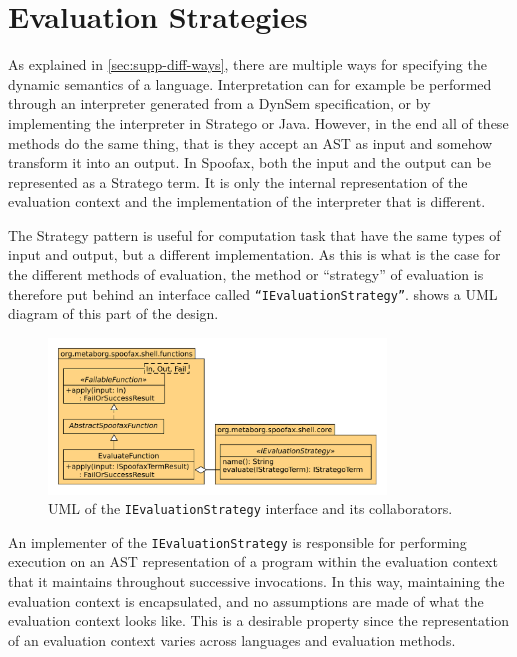 \section{Evaluation Strategies}
\label{sec:eval-strat}
As explained in \cref{sec:supp-diff-ways}, there are multiple ways for
specifying the dynamic semantics of a language. Interpretation can for example
be performed through an interpreter generated from a DynSem specification, or by
implementing the interpreter in Stratego or Java. However, in the end all of
these methods do the same thing, that is they accept an AST as input and somehow
transform it into an output. In Spoofax, both the input and the output can be
represented as a Stratego term. It is only the internal representation of the
evaluation context and the implementation of the interpreter that is different.

The Strategy pattern is useful for computation task that have the same types of
input and output, but a different implementation. As this is what is the case
for the different methods of evaluation, the method or ``strategy'' of
evaluation is therefore put behind an interface called
\texttt{``IEvaluationStrategy''}.  shows a UML diagram
of this part of the design.

\begin{figure}[b]
  \centering
  \includegraphics[width=0.8\textwidth]{uml-eval-strat}
  \caption{UML of the \texttt{IEvaluationStrategy} interface and its
    collaborators.}
  \label{fig:uml-eval-strat}
\end{figure}

An implementer of the \texttt{IEvaluationStrategy} is responsible for performing
execution on an AST representation of a program within the evaluation context
that it maintains throughout successive invocations. In this way, maintaining
the evaluation context is encapsulated, and no assumptions are made of what the
evaluation context looks like. This is a desirable property since the
representation of an evaluation context varies across languages and evaluation
methods.

